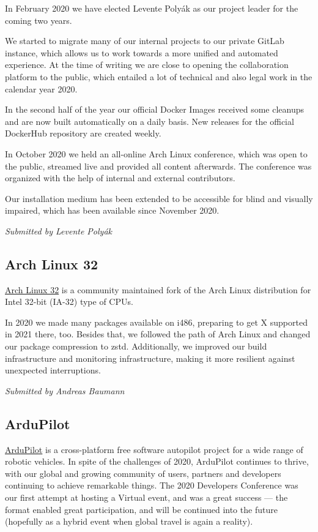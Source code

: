 \documentclass[a4paper]{report}
\begin{document}
In February 2020 we have elected Levente Polyák as our project leader for the coming two years.

We started to migrate many of our internal projects to our private GitLab instance, which allows us to work towards a more unified and automated experience. At the time of writing we are close to opening the collaboration platform to the public, which entailed a lot of technical and also legal work in the calendar year 2020.

In the second half of the year our official Docker Images received some cleanups and are now built automatically on a daily basis. New releases for the official DockerHub repository are created weekly.

In October 2020 we held an all-online Arch Linux conference, which was open to the public, streamed live and provided all content afterwards. The conference was organized with the help of internal and external contributors.

Our installation medium has been extended to be accessible for blind and visually impaired, which has been available since November 2020.

{\em Submitted by Levente Polyák}

\subsection{Arch Linux 32}

\href{https://archlinux32.org/}{Arch Linux 32} is a community maintained fork of the Arch Linux distribution for Intel 32-bit (IA-32) type of CPUs.

In 2020 we made many packages available on i486, preparing to get X supported in 2021 there, too.  Besides that, we followed the path of Arch Linux and changed our package compression to zstd.  Additionally, we improved our build infrastructure and monitoring infrastructure, making it more resilient against unexpected interruptions.

{\em Submitted by Andreas Baumann}

\subsection{ArduPilot}

\href{https://ardupilot.org/}{ArduPilot} is a cross-platform free software autopilot project for a wide range of robotic vehicles. In spite of the challenges of 2020, ArduPilot continues to thrive, with our global and growing community of users, partners and developers continuing to achieve remarkable things. The 2020 Developers Conference was our first attempt at hosting a Virtual event, and was a great success --- the format enabled great participation, and will be continued into the future (hopefully as a hybrid event when global travel is again a reality).
\end{document}
